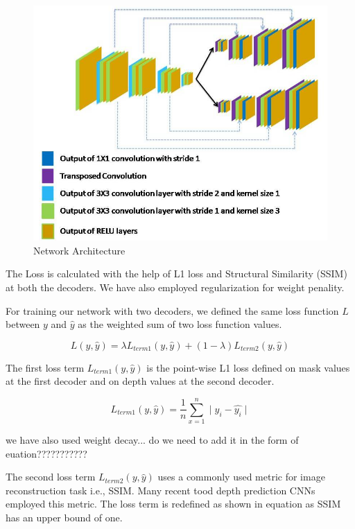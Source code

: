 \documentclass{article}
\begin{document}
\begin{figure}[h!]
\centering
  \includegraphics[width=1\textwidth]{networkarchitecture.jpg}
  \caption{Network Architecture}
  \label{fig:modelarch}
\end{figure}

The Loss is calculated with the help of L1 loss and Structural Similarity (SSIM) at both the decoders. We have also employed regularization for weight penality.

For training our network with two decoders, we defined the same loss function $L$ between $y$ and $\hat{y}$ as the weighted sum of two loss function values.

\begin{equation}
L(y, \hat{y}) = \lambda L_{term1}(y, \hat{y}) + (1 - \lambda) L_{term2}(y, \hat{y})
\end{equation}

The first loss term $L_{term1}(y, \hat{y})$ is the point-wise L1 loss defined on mask values at the first decoder and on depth values at the second decoder.

\begin{equation}
L_{term1}(y, \hat{y}) = \frac{1}{n} \sum_{x=1}^{n} \mid y_i - \hat{y_i} \mid
\end{equation}

we have also used weight decay... do we need to add it in the form of euation???????????

The second loss term $L_{term2}(y, \hat{y})$ uses a commonly used metric for image reconstruction task i.e., SSIM. Many recent tood depth prediction CNNs employed this metric. The loss term is redefined as shown in equation as SSIM has an upper bound of one.
\end{document}
